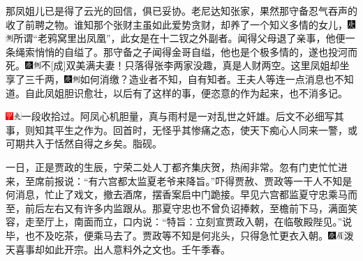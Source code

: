{那凤姐儿已是得了云光的回信，俱已妥协。老尼达知张家，果然那守备忍气吞声的收了前聘之物。谁知那个张财主虽如此爱势贪财，却养了一个知义多情的女儿，{\includegraphics[width=3mm]{../Images/00004}\includegraphics[width=3mm]{../Images/00011}\footnotesize \kaishu 所谓“老鸦窝里出凤凰”，此女是在十二钗之外副者。}闻得父母退了亲事，他便一条绳索悄悄的自缢了。那守备之子闻得金哥自缢，他也是个极多情的，遂也投河而死。{\includegraphics[width=3mm]{../Images/00004}\includegraphics[width=3mm]{../Images/00011}\footnotesize \kaishu 不{[}成{]}双美满夫妻！}只落得张李两家没趣，真是人财两空。这里凤姐却坐享了三千两，{\includegraphics[width=3mm]{../Images/00004}\includegraphics[width=3mm]{../Images/00011}\footnotesize \kaishu 如何消缴？造业者不知，自有知者。}王夫人等连一点消息也不知道。自此凤姐胆识愈壮，以后有了这样的事，便恣意的作为起来，也不消多记。{{\includegraphics[width=3mm]{../Images/00002}\includegraphics[width=3mm]{../Images/00012}\footnotesize \kaishu 一段收拾过。阿凤心机胆量，真与雨村是一对乱世之奸雄。后文不必细写其事，则知其平生之作为。回首时，无怪乎其惨痛之态，使天下痴心人同来一警，或可期共入于恬然自得之乡矣。脂砚。}

一日，正是贾政的生辰，宁荣二处人丁都齐集庆贺，热闹非常。忽有门吏忙忙进来，至席前报说：“有六宫都太监夏老爷来降旨。”吓得贾赦、贾政等一干人不知是何消息，忙止了戏文，撤去酒席，摆香案启中门跪接。早见六宫都监夏守忠乘马而至，前后左右又有许多内监跟从。那夏守忠也不曾负诏捧敕，至檐前下马，满面笑容，走至厅上，南面而立，口内说：“特旨：立刻宣贾政入朝，在临敬殿陛见。”说毕，也不及吃茶，便乘马去了。贾政等不知是何兆头，只得急忙更衣入朝。{\includegraphics[width=3mm]{../Images/00004}\includegraphics[width=3mm]{../Images/00010}\footnotesize \kaishu 泼天喜事却如此开宗。出人意料外之文也。壬午季春。}

}}
